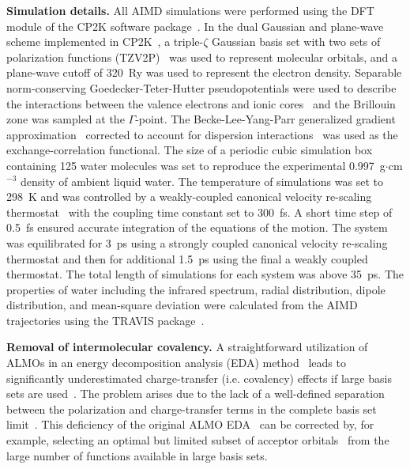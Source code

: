 \documentclass[journal=jacsat,manuscript=article]{achemso}
\begin{document}
\textbf{Simulation details.} All AIMD simulations were performed using the DFT module of the CP2K software package~\cite{www:cp2k}. 
In the dual Gaussian and plane-wave scheme implemented in CP2K~\cite{hutter2014cp2k}, a triple-$\zeta$ Gaussian basis set with two sets of polarization functions (TZV2P)~\cite{vandevondele2007gaussian} was used to represent molecular orbitals, and a plane-wave cutoff of 320~Ry was used to represent the electron density. 
Separable norm-conserving Goedecker-Teter-Hutter pseudopotentials were used to describe the interactions between the valence electrons and ionic cores~\cite{goedecker1996separable,krack2005pseudopotentials} and the Brillouin zone was sampled at the $\Gamma$-point. 
The Becke-Lee-Yang-Parr generalized gradient approximation~\cite{becke1988density, lee1988development} corrected to account for dispersion interactions~\cite{grimme2010consistent} was used as the exchange-correlation functional. 
The size of a periodic cubic simulation box containing 125 water molecules was set to reproduce the experimental 0.997~g$\cdot$cm$^{-3}$ density of ambient liquid water. 
The temperature of simulations was set to 298~K and was controlled by a weakly-coupled canonical velocity re-scaling thermostat~\cite{bussi2007canonical} with the coupling time constant set to 300~fs. 
A short time step of 0.5~fs ensured accurate integration of the equations of the motion. 
The system was equilibrated for 3~ps using a strongly coupled canonical velocity re-scaling thermostat and then for additional 1.5~ps using the final a weakly coupled thermostat. 
The total length of simulations for each system was above 35~ps. 
The properties of water including the infrared spectrum, radial distribution, dipole distribution, and mean-square deviation were calculated from the AIMD trajectories using the TRAVIS package~\cite{brehm2011travis}.  

\textbf{Removal of intermolecular covalency.} A straightforward utilization of ALMOs in an energy decomposition analysis (EDA) method~\cite{khaliullin2007unravelling} leads to significantly underestimated charge-transfer (i.e. covalency) effects if large basis sets are used~\cite{horn2015polarization,lao2016energy}. 
The problem arises due to the lack of a well-defined separation between the polarization and charge-transfer terms in the complete basis set limit~\cite{misquitta2013charge,horn2015polarization}. 
This deficiency of the original ALMO EDA~\cite{khaliullin2007unravelling} can be corrected by, for example, selecting an optimal but limited subset of acceptor orbitals~\cite{horn2015polarization} from the large number of functions available in large basis sets. 
\end{document}
